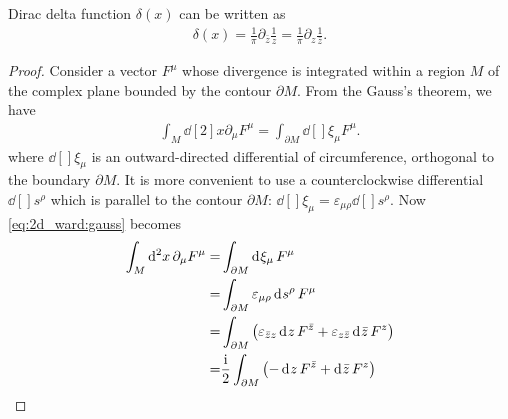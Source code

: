 \documentclass[10pt]{article}
\newcommand{\ii}{\mathrm{i}}
\begin{document}
\begin{claim}
    Dirac delta function $\delta(x)$ can be written as\snm
    \begin{align}
        \delta(x)=\frac{1}{\pi}\partial_{\bar{z}}\frac{1}{z}=\frac{1}{\pi}\partial_{z}\frac{1}{\bar{z}}.\label{eq:2d_ward:dirac_another}
    \end{align}
\end{claim}
\begin{proof}
    Consider a vector $F^\mu$ whose divergence is integrated within a region $M$ of the complex plane bounded by the contour $\partial M$.
    From the Gauss's theorem, we have
    \begin{align}
        \int_M\dd[2]{x}\partial_\mu F^\mu=\int_{\partial M}\dd[]{\xi_\mu} F^\mu.\label{eq:2d_ward:gauss}
    \end{align}
    where $\dd[]{\xi_\mu}$ is an outward-directed differential of circumference, orthogonal to the boundary $\partial M$.
    It is more convenient to use a counterclockwise differential $\dd[]{s^\rho}$ which is parallel to the contour $\partial M$: $\dd[]{\xi_\mu}=\varepsilon_{\mu\rho}\dd[]{s^\rho}$.
    Now \cref{eq:2d_ward:gauss} becomes
    \begin{align}
        \int_M\dd[2]{x}\partial_\mu F^\mu= & \int_{\partial M}\dd[]{\xi_\mu} F^\mu\notag                                                                             \\
        =                                  & \int_{\partial M}\varepsilon_{\mu\rho}\dd[]{s^\rho}F^\mu\notag                                                          \\
        =                                  & \int_{\partial M}\left(\varepsilon_{\bar{z}z}\dd[]{z}F^{\bar{z}}+\varepsilon_{z\bar{z}}\dd[]{\bar{z}}F^{z}\right)\notag \\
        =                                  & \frac{\ii}{2}\int_{\partial M}\left(-\dd[]{z}F^{\bar{z}}+\dd[]{\bar{z}}F^{z}\right)\label{eq:2dcft:another_gauss}
    \end{align}


\end{proof}
\end{document}
